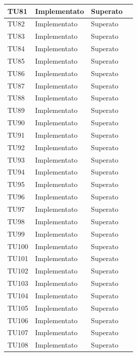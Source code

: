 \begin{longtable}{|>{\centering\arraybackslash}m{1.6cm}|>{\centering\arraybackslash}m{6.41cm}|>{\centering\arraybackslash}m{3.1cm}| c |}
		\rowcolor{LightGray}
	TU81 & Implementato & Superato  \\ \hline
	TU82 & Implementato & Superato  \\ \hline
		\rowcolor{LightGray}
	TU83 & Implementato & Superato  \\ \hline
	TU84 & Implementato & Superato  \\ \hline
		\rowcolor{LightGray}
	TU85 & Implementato & Superato  \\ \hline
	TU86 & Implementato & Superato  \\ \hline
		\rowcolor{LightGray}
	TU87 & Implementato & Superato  \\ \hline
	TU88 & Implementato & Superato  \\ \hline
		\rowcolor{LightGray}
	TU89 & Implementato & Superato  \\ \hline
	TU90 & Implementato & Superato  \\ \hline
		\rowcolor{LightGray}
	TU91 & Implementato & Superato  \\ \hline
	TU92 & Implementato & Superato  \\ \hline
		\rowcolor{LightGray}
	TU93 & Implementato & Superato  \\ \hline
	TU94 & Implementato & Superato  \\ \hline
		\rowcolor{LightGray}
	TU95 & Implementato & Superato  \\ \hline
	TU96 & Implementato & Superato  \\ \hline
		\rowcolor{LightGray}
	TU97 & Implementato & Superato  \\ \hline
	TU98 & Implementato & Superato  \\ \hline
		\rowcolor{LightGray}
	TU99 & Implementato & Superato  \\ \hline
	TU100 & Implementato & Superato  \\ \hline
		\rowcolor{LightGray}
	TU101 & Implementato & Superato  \\ \hline
	TU102 & Implementato & Superato  \\ \hline
		\rowcolor{LightGray}
	TU103 & Implementato & Superato  \\ \hline
	TU104 & Implementato & Superato  \\ \hline
		\rowcolor{LightGray}
	TU105 & Implementato & Superato  \\ \hline
	TU106 & Implementato & Superato  \\ \hline
		\rowcolor{LightGray}
	TU107 & Implementato & Superato  \\ \hline
	TU108 & Implementato & Superato  \\ \hline

\end{longtable}
